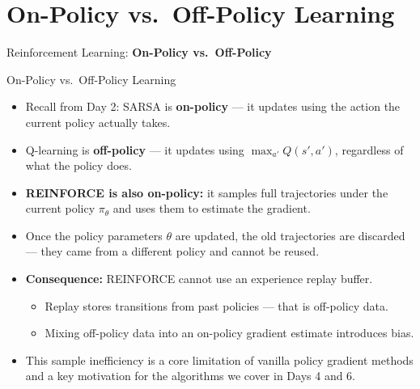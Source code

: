\section{On-Policy vs.\ Off-Policy Learning}
\begin{frame}{}
    \LARGE Reinforcement Learning: \textbf{On-Policy vs.\ Off-Policy}
\end{frame}

\begin{frame}{On-Policy vs.\ Off-Policy Learning}
\begin{itemize}
    \item Recall from Day 2: SARSA is \textbf{on-policy} --- it updates using the action the current policy actually takes.
    \item Q-learning is \textbf{off-policy} --- it updates using $\max_{a'} Q(s',a')$, regardless of what the policy does.
    \pause
    \item \textbf{REINFORCE is also on-policy:} it samples full trajectories under the current policy $\pi_\theta$ and uses them to estimate the gradient.
    \item Once the policy parameters $\theta$ are updated, the old trajectories are discarded --- they came from a different policy and cannot be reused.
    \pause
    \item \textbf{Consequence:} REINFORCE cannot use an experience replay buffer.
    \begin{itemize}
        \item Replay stores transitions from past policies --- that is off-policy data.
        \item Mixing off-policy data into an on-policy gradient estimate introduces bias.
    \end{itemize}
    \pause
    \item This sample inefficiency is a core limitation of vanilla policy gradient methods and a key motivation for the algorithms we cover in Days 4 and 6.
\end{itemize}
\end{frame}
